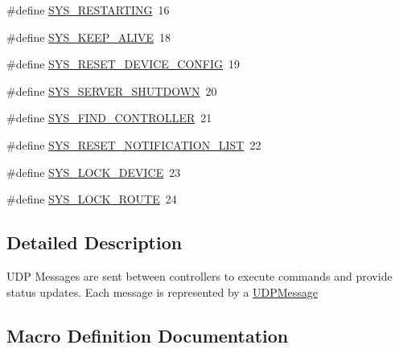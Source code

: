 \begin{DoxyCompactItemize}
\item 
\#define \hyperlink{group___u_d_p_message_i_d_ga9ed42f3a7fcc253fa49ce8ff33a75422}{S\+Y\+S\+\_\+\+R\+E\+S\+T\+A\+R\+T\+I\+NG}~16
\item 
\#define \hyperlink{group___u_d_p_message_i_d_ga596f44c285ab391c72addd0e803b0fc4}{S\+Y\+S\+\_\+\+K\+E\+E\+P\+\_\+\+A\+L\+I\+VE}~18
\item 
\#define \hyperlink{group___u_d_p_message_i_d_gaef042a9ee57e8ddf94286a3263734468}{S\+Y\+S\+\_\+\+R\+E\+S\+E\+T\+\_\+\+D\+E\+V\+I\+C\+E\+\_\+\+C\+O\+N\+F\+IG}~19
\item 
\#define \hyperlink{group___u_d_p_message_i_d_ga3021efce231e9a711d6f498630327086}{S\+Y\+S\+\_\+\+S\+E\+R\+V\+E\+R\+\_\+\+S\+H\+U\+T\+D\+O\+WN}~20
\item 
\#define \hyperlink{group___u_d_p_message_i_d_gadfda0e5a5a6a08de555dd55182a4cd87}{S\+Y\+S\+\_\+\+F\+I\+N\+D\+\_\+\+C\+O\+N\+T\+R\+O\+L\+L\+ER}~21
\item 
\#define \hyperlink{group___u_d_p_message_i_d_gab96f76ffa1af60bebfd871ca1e7c4a08}{S\+Y\+S\+\_\+\+R\+E\+S\+E\+T\+\_\+\+N\+O\+T\+I\+F\+I\+C\+A\+T\+I\+O\+N\+\_\+\+L\+I\+ST}~22
\item 
\#define \hyperlink{group___u_d_p_message_i_d_ga42644954a92421cfe92c2e3d20f795ce}{S\+Y\+S\+\_\+\+L\+O\+C\+K\+\_\+\+D\+E\+V\+I\+CE}~23
\item 
\#define \hyperlink{group___u_d_p_message_i_d_ga9ba07526db57f9ec44d01fe3eba9cc60}{S\+Y\+S\+\_\+\+L\+O\+C\+K\+\_\+\+R\+O\+U\+TE}~24
\end{DoxyCompactItemize}


\subsection{Detailed Description}
U\+DP Messages are sent between controllers to execute commands and provide status updates. Each message is represented by a \hyperlink{class_u_d_p_message}{U\+D\+P\+Message} 

\subsection{Macro Definition Documentation}
\mbox{\label{group___u_d_p_message_i_d_gaf8a3426c6f740f351255d50cdda3c9f8}} 
